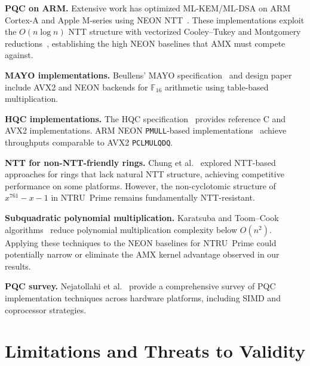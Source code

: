 \documentclass[utf8]{FrontiersinHarvard}
\begin{document}
\textbf{PQC on ARM.} Extensive work has optimized ML-KEM/ML-DSA on ARM Cortex-A and Apple M-series using NEON NTT~\cite{botros2019pqm4, becker2022neon}. These implementations exploit the $O(n \log n)$ NTT structure with vectorized Cooley--Tukey and Montgomery reductions~\cite{longa2016speeding}, establishing the high NEON baselines that AMX must compete against.

\textbf{MAYO implementations.} Beullens' MAYO specification~\cite{mayo2025spec} and design paper~\cite{beullens2022mayo} include AVX2 and NEON backends for $\mathbb{F}_{16}$ arithmetic using table-based multiplication.

\textbf{HQC implementations.} The HQC specification~\cite{hqc2025spec} provides reference C and AVX2 implementations. ARM NEON \texttt{PMULL}-based implementations~\cite{arm2021neon} achieve throughputs comparable to AVX2 \texttt{PCLMULQDQ}.

\textbf{NTT for non-NTT-friendly rings.} Chung et al.~\cite{chung2021ntt} explored NTT-based approaches for rings that lack natural NTT structure, achieving competitive performance on some platforms. However, the non-cyclotomic structure of $x^{761}-x-1$ in NTRU~Prime remains fundamentally NTT-resistant.

\textbf{Subquadratic polynomial multiplication.} Karatsuba and Toom--Cook algorithms~\cite{harvey2014karatsuba} reduce polynomial multiplication complexity below $O(n^2)$. Applying these techniques to the NEON baselines for NTRU~Prime could potentially narrow or eliminate the AMX kernel advantage observed in our results.

\textbf{PQC survey.} Nejatollahi et al.~\cite{nejatollahi2019pqcsurvey} provide a comprehensive survey of PQC implementation techniques across hardware platforms, including SIMD and coprocessor strategies.


\section{Limitations and Threats to Validity}
\label{sec:limitations}
\end{document}
